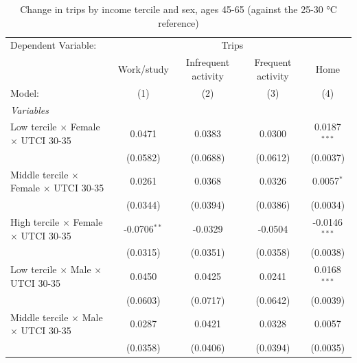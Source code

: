 
\begin{table}[htbp]
   \caption{\label{table_rq3_45-65} Change in trips by income tercile and sex, ages 45-65 (against the 25-30 °C reference)}
   \centering
   \scriptsize
   \renewcommand*{\arraystretch}{0.75}
   \begin{tabular}{lcccc}
      \tabularnewline \midrule \midrule
      Dependent Variable: & \multicolumn{4}{c}{Trips}\\
                                                           & Work/study      & Infrequent activity & Frequent activity & Home \\   
      Model:                                               & (1)             & (2)                 & (3)               & (4)\\  
      \midrule
      \emph{Variables}\\
      Low tercile $\times$ Female $\times$ UTCI 30-35      & 0.0471          & 0.0383              & 0.0300            & 0.0187$^{***}$\\   
                                                           & (0.0582)        & (0.0688)            & (0.0612)          & (0.0037)\\   
      Middle tercile $\times$ Female $\times$ UTCI 30-35   & 0.0261          & 0.0368              & 0.0326            & 0.0057$^{*}$\\   
                                                           & (0.0344)        & (0.0394)            & (0.0386)          & (0.0034)\\   
      High tercile $\times$ Female $\times$ UTCI 30-35     & -0.0706$^{**}$  & -0.0329             & -0.0504           & -0.0146$^{***}$\\   
                                                           & (0.0315)        & (0.0351)            & (0.0358)          & (0.0038)\\   
      Low tercile $\times$ Male $\times$ UTCI 30-35        & 0.0450          & 0.0425              & 0.0241            & 0.0168$^{***}$\\   
                                                           & (0.0603)        & (0.0717)            & (0.0642)          & (0.0039)\\   
      Middle tercile $\times$ Male $\times$ UTCI 30-35     & 0.0287          & 0.0421              & 0.0328            & 0.0057\\   
                                                           & (0.0358)        & (0.0406)            & (0.0394)          & (0.0035)\\   

\end{tabular}
\end{table}
